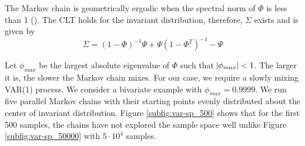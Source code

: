 \documentclass[12pt]{article}
\theoremstyle{remark}
\begin{document}
The Markov chain is geometrically ergodic when the spectral norm of $\Phi$ is less than 1 (\cite{10.2307/1427459}). The CLT holds for the invariant distribution, therefore, $\Sigma$ exists and is given by
%
\[
\Sigma = (1 - \Phi)^{-1}\Psi + \Psi(1 - \Phi^T)^{-1} - \Psi
\]

Let $\phi_{max}$ be the largest absolute eigenvalue of $\Phi$ such that $\abs{\phi_{max}} < 1$. The larger it is, the slower the Markov chain mixes. For our case, we require a slowly mixing VAR(1) process. We consider a bivariate example with $\phi_{max} = 0.9999$. We run five parallel Markov chains with their starting points evenly distributed about the center of invariant distribution. Figure \ref{subfig:var-sp_500} shows that for the first 500 samples, the chains have not explored the sample space well unlike Figure \ref{subfig:var-sp_50000} with $5\cdot 10^4$ samples.  
\end{document}
